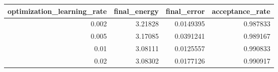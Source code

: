 \begin{tabular}{rrrr}
\toprule
optimization_learning_rate & final_energy & final_error & acceptance_rate \\
\midrule
0.002 & 3.21828 & 0.0149395 & 0.987833 \\
0.005 & 3.17085 & 0.0391241 & 0.989167 \\
0.01 & 3.08111 & 0.0125557 & 0.990833 \\
0.02 & 3.08302 & 0.0177126 & 0.990917 \\
\bottomrule
\end{tabular}
